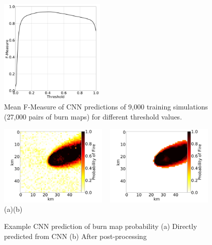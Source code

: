 \documentclass[smallcondensed]{svjour3}     %
\begin{document}
\begin{figure}[htbp]
\centering
  \includegraphics[width=0.45\textwidth]{optimalThreshold.png}
\caption{Mean F-Measure of CNN predictions of 9,000 training simulations (27,000 pairs of burn maps) for different threshold values.}
\label{fig:fMeasureVsThreshold}       %
\end{figure}

\begin{figure}[htb]
	\centering
	\includegraphics[width=0.46\textwidth]{exampleNetworkRaw0.png}
	~
	\includegraphics[width=0.46\textwidth]{exampleNetworkProcessed0.png}
	\\
	(a)\hspace{0.23\textwidth}(b)
\caption{Example CNN prediction of burn map probability (a) Directly predicted from CNN (b) After post-processing}
\label{fig:postProcess}       %
\end{figure}
\end{document}
